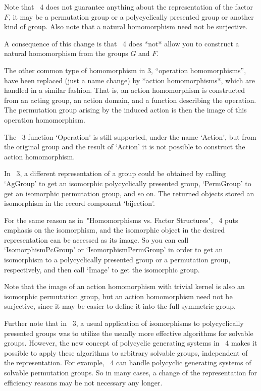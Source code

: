 Note that {\GAP}~4 does not guarantee anything about the representation
of the factor $F$, it may be a permutation group or a polycyclically
presented group or another kind of group.
Also note that a natural homomorphism need not be surjective.

A consequence of this change is that {\GAP}~4 does *not* allow you to
construct a natural homomorphism from the groups $G$ and $F$.

The other common type of homomorphism in {\GAP} 3, ``operation
homomorphisms'', have been replaced (just a name change) by *action
homomorphisms*, which are handled in a similar fashion.  That is, an
action homomorphism is constructed from an acting group, an action
domain, and a function describing the operation.  The permutation
group arising by the induced action is then the image of this
operation homomorphism.

The {\GAP}~3 function `Operation' is still supported, under the name `Action',
but from the original group and the result of `Action' it is not
possible to construct the action homomorphism.



In {\GAP}~3, a different representation of a group could be obtained by
calling `AgGroup' to get an isomorphic polycyclically presented group,
`PermGroup' to get an isomorphic permutation group, and so on.
The returned objects stored an isomorphism in the record component
`bijection'.

For the same reason as in~"Homomorphisms vs. Factor Structures",
{\GAP}~4 puts emphasis on the isomorphism,
and the isomorphic object in the desired representation can be accessed
as its image.
So you can call `IsomorphismPcGroup' or `IsomorphismPermGroup' in order
to get an isomorphism to a polycyclically presented group or a
permutation group, respectively, and then call `Image' to get the
isomorphic group.

Note that the image of an action homomorphism with trivial kernel is
also an isomorphic permutation group, but an action homomorphism need
not be surjective, since it may be easier to define it into the full
symmetric group.

Further note that in {\GAP}~3, a usual application of isomorphisms to
polycyclically presented groups was to utilize the usually more
effective algorithms for solvable groups.  However, the new concept of
polycyclic generating systems in {\GAP}~4 makes it possible to apply
these algorithms to arbitrary solvable groups, independent of the
representation.  For example, {\GAP}~4 can handle polycyclic
generating systems of solvable permutation groups.  So in many cases,
a change of the representation for efficiency reasons may be not
necessary any longer.

